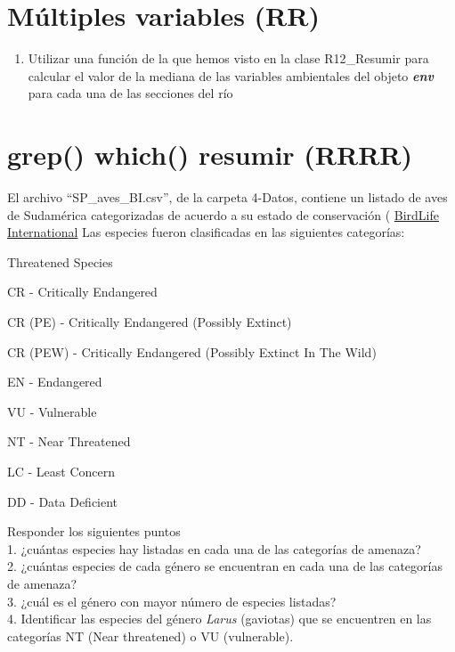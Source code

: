 \documentclass[]{book}
\providecommand{\tightlist}{%
  \setlength{\itemsep}{0pt}\setlength{\parskip}{0pt}}
\begin{document}
\hypertarget{muxfaltiples-variables-rr}{%
\section{Múltiples variables (RR)}\label{muxfaltiples-variables-rr}}

\begin{enumerate}
\def\labelenumi{\arabic{enumi}.}
\tightlist
\item
  Utilizar una función de la que hemos visto en la clase R12\_Resumir para calcular el valor de la mediana de las variables ambientales del objeto \textbf{\emph{env}} para cada una de las secciones del río
\end{enumerate}

\hypertarget{grep-which-resumir-rrrr}{%
\section{grep() which() resumir (RRRR)}\label{grep-which-resumir-rrrr}}

El archivo ``SP\_aves\_BI.csv'', de la carpeta 4-Datos, contiene un listado de aves de Sudamérica categorizadas de acuerdo a su estado de conservación ( \href{http://www.birdlife.org/datazone/}{BirdLife International}
Las especies fueron clasificadas en las siguientes categorías:

Threatened Species

CR - Critically Endangered

CR (PE) - Critically Endangered (Possibly Extinct)

CR (PEW) - Critically Endangered (Possibly Extinct In The Wild)

EN - Endangered

VU - Vulnerable

NT - Near Threatened

LC - Least Concern

DD - Data Deficient

Responder los siguientes puntos\\
1. ¿cuántas especies hay listadas en cada una de las categorías de amenaza?\\
2. ¿cuántas especies de cada género se encuentran en cada una de las categorías de amenaza?\\
3. ¿cuál es el género con mayor número de especies listadas?\\
4. Identificar las especies del género \emph{Larus} (gaviotas) que se encuentren en las categorías NT (Near threatened) o VU (vulnerable).
\end{document}
